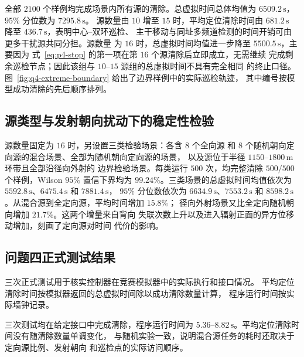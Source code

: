 全部 $2100$ 个样例均完成场景内所有源的清除。总虚拟时间总体均值为
$6509.2\,\mathrm s$，$95\%$ 分位数为 $7295.8\,\mathrm s$。
源数量由 $10$ 增至 $15$ 时，平均定位清除时间由
$681.2\,\mathrm s$ 降至 $436.7\,\mathrm s$，表明中心--双环巡检、
主干移动与同址多频道检测的时间开销可由更多干扰源共同分担。源数量
为 $16$ 时，总虚拟时间均值进一步降至 $5500.5\,\mathrm s$，主要因为
式~\eqref{eq:p4-stop} 的第一项在第 $16$ 个源清除后立即成立，无需继续
完成剩余巡检节点；因此该组与 $10$--$15$ 源组的总虚拟时间不具有完全相同
的终止口径。
图~\ref{fig:q4-extreme-boundary} 给出了边界样例中的实际巡检轨迹，
其中编号按模型成功清除的先后顺序排列。

\subsection{源类型与发射朝向扰动下的稳定性检验}

源数量固定为 $16$ 时，另设置三类检验场景：各含 $8$ 个全向源
和 $8$ 个随机朝向定向源的混合场景、全部为随机朝向定向源的场景，
以及源位于半径 $1150$--$1800\,\mathrm m$ 环带且全部沿径向外射的
边界检验场景。每类运行 $500$ 次，均完整清除 $500/500$ 个样例，Wilson
$95\%$ 置信下界均为 $99.24\%$。三类场景的总虚拟时间均值依次为
$5592.8\,\mathrm s$、$6475.4\,\mathrm s$ 和 $7881.4\,\mathrm s$，
$95\%$ 分位数依次为 $6634.9\,\mathrm s$、$7553.2\,\mathrm s$ 和
$8598.2\,\mathrm s$。从混合源到全定向源，平均时间增加 $15.8\%$；
径向外射场景又比全定向随机朝向增加 $21.7\%$。这两个增量来自背向
失联次数上升以及进入辐射正面的异方位移动增加，刻画了定向源对时间
代价的影响。

\subsection{问题四正式测试结果}

三次正式测试用于核实控制器在竞赛模拟器中的实际执行和接口情况。
平均定位清除时间按模拟器返回的总虚拟时间除以成功清除数量计算，
程序运行时间按实际墙钟记录。

\begin{table}[H]
  \centering
  \caption{问题四三次正式测试结果}
  \label{tab:p4-official}
\end{table}

三次测试均在给定接口中完成清除，程序运行时间为
$5.36$--$8.82\,\mathrm s$。平均定位清除时间没有随清除数量单调变化，
与随机实验一致，说明混合源任务的耗时还取决于定向源比例、发射朝向
和巡检点的实际访问顺序。
